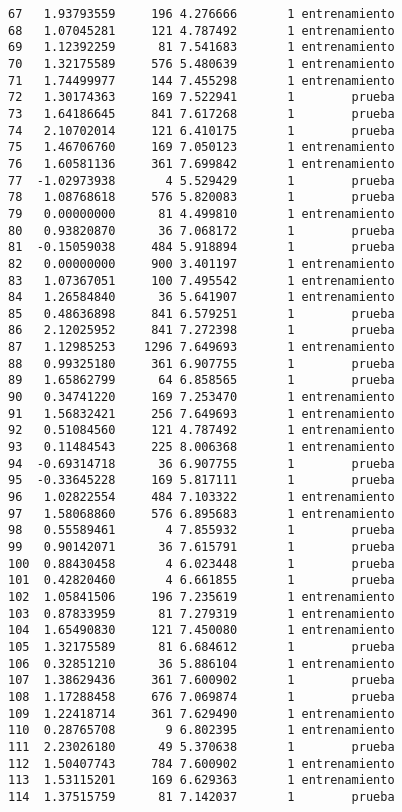 \documentclass[
  letterpaper,
  DIV=11,
  numbers=noendperiod]{scrreprt}
\begin{document}
\begin{verbatim}
67   1.93793559     196 4.276666       1 entrenamiento
68   1.07045281     121 4.787492       1 entrenamiento
69   1.12392259      81 7.541683       1 entrenamiento
70   1.32175589     576 5.480639       1 entrenamiento
71   1.74499977     144 7.455298       1 entrenamiento
72   1.30174363     169 7.522941       1        prueba
73   1.64186645     841 7.617268       1        prueba
74   2.10702014     121 6.410175       1        prueba
75   1.46706760     169 7.050123       1 entrenamiento
76   1.60581136     361 7.699842       1 entrenamiento
77  -1.02973938       4 5.529429       1        prueba
78   1.08768618     576 5.820083       1        prueba
79   0.00000000      81 4.499810       1 entrenamiento
80   0.93820870      36 7.068172       1        prueba
81  -0.15059038     484 5.918894       1        prueba
82   0.00000000     900 3.401197       1 entrenamiento
83   1.07367051     100 7.495542       1 entrenamiento
84   1.26584840      36 5.641907       1 entrenamiento
85   0.48636898     841 6.579251       1        prueba
86   2.12025952     841 7.272398       1        prueba
87   1.12985253    1296 7.649693       1 entrenamiento
88   0.99325180     361 6.907755       1        prueba
89   1.65862799      64 6.858565       1        prueba
90   0.34741220     169 7.253470       1 entrenamiento
91   1.56832421     256 7.649693       1 entrenamiento
92   0.51084560     121 4.787492       1 entrenamiento
93   0.11484543     225 8.006368       1 entrenamiento
94  -0.69314718      36 6.907755       1        prueba
95  -0.33645228     169 5.817111       1        prueba
96   1.02822554     484 7.103322       1 entrenamiento
97   1.58068860     576 6.895683       1 entrenamiento
98   0.55589461       4 7.855932       1        prueba
99   0.90142071      36 7.615791       1        prueba
100  0.88430458       4 6.023448       1        prueba
101  0.42820460       4 6.661855       1        prueba
102  1.05841506     196 7.235619       1 entrenamiento
103  0.87833959      81 7.279319       1 entrenamiento
104  1.65490830     121 7.450080       1 entrenamiento
105  1.32175589      81 6.684612       1        prueba
106  0.32851210      36 5.886104       1 entrenamiento
107  1.38629436     361 7.600902       1        prueba
108  1.17288458     676 7.069874       1        prueba
109  1.22418714     361 7.629490       1 entrenamiento
110  0.28765708       9 6.802395       1 entrenamiento
111  2.23026180      49 5.370638       1        prueba
112  1.50407743     784 7.600902       1 entrenamiento
113  1.53115201     169 6.629363       1 entrenamiento
114  1.37515759      81 7.142037       1        prueba

\end{verbatim}
\end{document}
